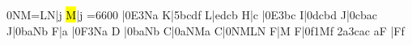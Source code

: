 \temps\notes\qqB0NM{=L}N|\hu j\enotes
\barre\notes{}\hl M|\hu j\enotes
\cleftoksi={{6}{6}{0}{0}}\changeclefs
\notes|\Ilegl0E\dqh3Na\enotes
\temps\notes\bohu K|\qqh5bcdf\enotes
\barre\notes\bohu L|edcb\enotes
\temps\Notes\bohu H|\qu c\enotes
\temps\notes|\Ilegl0E\dqh3bc\enotes
\barre\notes\bohu I|\qqh0dcbd\enotes
\temps\notes\bohu J|\qqh0cbac\enotes
\Alaligne\notes\bohu J|\qqh0baNb\enotes
\temps\notes\bohu F\sk|\qu a\enotes
\temps\notes|\Ilegl0F\dqh3Na\enotes
\barre\notes{}\bohu D\relax
    |\qqh0baNb\enotes
\temps\notes\bohu C|\qqh0aNMa\enotes
\barre\notes{}\bohu C|\qqh0NMLN\enotes
\temps\NOtes\bohu F|\hu M\enotes
\barre\notes\bohu F|\itenu0f\itenl1M\bohl f\sk\sk
\itenu2a\itenu3c\zq a\cu c\qsk\enotes
\NOtes\pointdorgue a\bohu F\relax
  |\pointdurgue F\bohl f\enotes
\finmorceau   \rightline{\sl \aujourdhui}
\eject
\bye
\endinput
